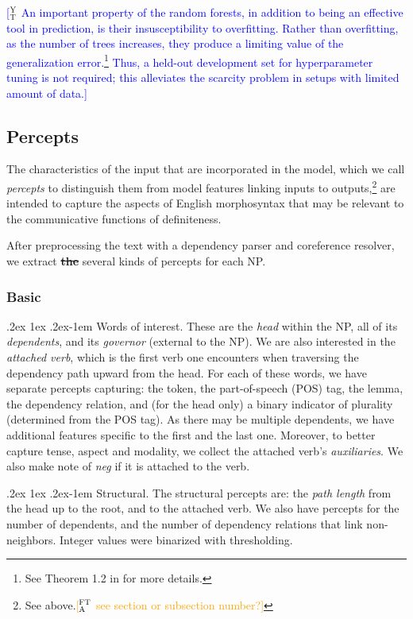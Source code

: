 \documentclass[11pt,letterpaper]{article}
\makeatletter
\newcommand{\ensuretext}[1]{#1}
\newcommand{\ytmarker}{\ensuretext{\textcolor{blue}{\ensuremath{^{\textsc{Y}}_{\textsc{T}}}}}}
\newcommand{\ftamarker}{\ensuretext{\textcolor{orange}{\ensuremath{^{\textsc{FT}}_{\textsc{A}}}}}}
\newcommand{\arkcomment}[3]{\ensuretext{\textcolor{#3}{[#1 #2]}}}
\newcommand{\yt}[1]{\arkcomment{\ytmarker}{#1}{blue}}
\newcommand{\fta}[1]{\arkcomment{\ftamarker}{#1}{orange}}
\renewcommand{\paragraph}{%
  \@startsection{paragraph}{4}%
  {\z@}{.2ex \@plus 1ex \@minus .2ex}{-1em}%
  {\normalfont\normalsize\bfseries}%
}
\makeatother
\begin{document}
\yt{An important property of the random forests, in addition to being an effective tool in prediction, is their insusceptibility to overfitting. Rather than overfitting, as the number of trees increases, they produce a limiting value of the generalization error.\footnote{See Theorem 1.2 in \cite{Breiman:2001} for more details.} Thus, a held-out development set for hyperparameter tuning is not required; this alleviates the scarcity problem in setups with limited amount of data.}

\subsection{Percepts}\label{sec:feats}

The characteristics of the input that are incorporated in the model, which we call \emph{percepts} 
to distinguish them from model features linking inputs to outputs,\footnote{See above.\fta{see section or subsection number?}} 
are intended to capture the aspects of English morphosyntax that may be relevant 
to the communicative functions of definiteness.

After preprocessing the text with a dependency parser and coreference resolver, 
we extract \sout{\bf the} several kinds of percepts for each NP.

\subsubsection{Basic}

\paragraph{Words of interest.} 
These are the \emph{head} within the NP, all of its \emph{dependents}, and its \emph{governor} (external to the NP). 
We are also interested in the \emph{attached verb}, which is the first verb one encounters when traversing the dependency path upward from the head. 
For each of these words, we have separate percepts capturing: the token, the part-of-speech (POS) tag, the lemma, 
the dependency relation,
and (for the head only) a binary indicator of plurality (determined from the POS tag).
As there may be multiple dependents, we have additional features specific to the first and the last one. 
Moreover, to better capture tense, aspect and modality, we collect the attached verb's \emph{auxiliaries}. 
We also make note of \emph{neg} if it is attached to the verb.
    
\paragraph{Structural.} 
The structural percepts are: the \emph{path length} from the head up to the root, and to the attached verb. 
We also have percepts for the number of dependents, and the number of dependency relations that link non-neighbors.
Integer values were binarized with thresholding.
\end{document}
